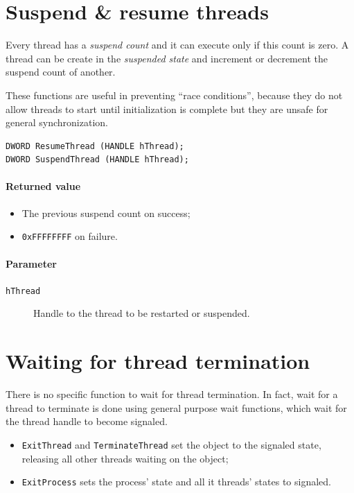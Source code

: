 \section{Suspend \& resume threads}
Every thread has a \emph{suspend count} and it can execute only if this count is zero. A thread can be create in the \emph{suspended state} and increment or decrement the suspend count of another.

These functions are useful in preventing ``race conditions'', because they do not allow threads to start until initialization is complete but they are unsafe for general synchronization.

\begin{verbatim}
DWORD ResumeThread (HANDLE hThread);
DWORD SuspendThread (HANDLE hThread);
\end{verbatim}

\paragraph{Returned value}
\begin{itemize}
\item The previous suspend count on success;
\item \texttt{0xFFFFFFFF} on failure.
\end{itemize}

\paragraph{Parameter}
\begin{description}
\item [\texttt{hThread}] Handle to the thread to be restarted or suspended.
\end{description}

\section{Waiting for thread termination}
There is no specific function to wait for thread termination. In fact, wait for a thread to terminate is done using general purpose wait functions, which wait for the thread handle to become signaled.
\begin{itemize}
\item \texttt{ExitThread} and \texttt{TerminateThread} set the object to the signaled state, releasing all other threads waiting on the object;
\item \texttt{ExitProcess} sets the process' state and all it threads' states to signaled.
\end{itemize}

